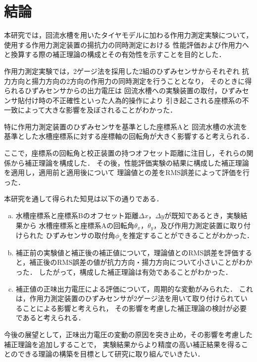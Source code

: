 \section{結論}
本研究では，回流水槽を用いたタイヤモデルに加わる作用力測定実験について，
使用する作用力測定装置の揚抗力の同時測定における
性能評価および作用力へと換算する際の補正理論の構成とその有効性を示すことを目的とした．

作用力測定実験では，2ゲージ法を採用した2組のひずみセンサからそれぞれ
抗力方向と揚力方向の2方向の作用力の同時測定を行うこととなり，
そのときに得られるひずみセンサからの出力電圧は
回流水槽への実験装置の取付，ひずみセンサ貼付け時の不正確性といった人為的操作により
引き起こされる座標系の不一致によって大きな影響を及ぼされることがわかった．


特に作用力測定装置のひずみセンサを基準とした座標系Aと
回流水槽の水流を基準とした水槽座標系に対する座標軸の回転角が大きく影響すると考えられる．


ここで，座標系の回転角と校正装置の持つオフセット距離に注目し，それらの関係から補正理論を構成した．
その後，性能評価実験の結果に構成した補正理論を適用し，適用前と適用後について
理論値との差をRMS誤差によって評価を行った．

本研究を通して得られた知見は以下の通りである．

\begin{enumerate}[(a)]
    \item   水槽座標系と座標系Bのオフセット距離$\Delta x$，$\Delta y$が既知であるとき，実験結果から
            水槽座標系と座標系Aの回転角$\theta_x$，$\theta_y$，及び作用力測定装置に取り付けられた
            ひずみセンサの取付角$\phi_s$を推定することができることがわかった．\\
    \item   補正前の実験値と補正後の補正値について，理論値とのRMS誤差を評価すると，補正後のRMS誤差の値が抗力方向・揚力方向について小さいことがわかった．
            したがって，構成した補正理論は有効であることがわかった．\\
    \item   補正値の正味出力電圧による評価について，周期的な変動がみられた．
            これは，作用力測定装置のひずみセンサが2ゲージ法を用いて取り付けられていることによる影響と考えられ，
            その影響を考慮した補正理論の検討が必要であると考えられる．
\end{enumerate}

今後の展望として，正味出力電圧の変動の原因を突き止め，その影響を考慮した補正理論を追加しすることで，
実験結果からより精度の高い補正結果を得ることのできる理論の構築を目標として研究に取り組んでいきたい．
